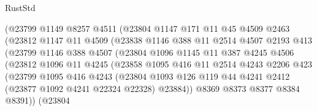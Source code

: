\begin{lexlean}{RustStd}
\begin{coremodule}
                      (@23799
                        @1149
                        @8257
                        @4511
                        (@23804
                          @1147
                          @171
                          @11
                          @45
                          @4509
                          @2463
                          (@23812
                            @1147
                            @11
                            @4509
                            (@23838
                              @1146
                              @388
                              @11
                              @2514
                              @4507
                              @2193
                              @413
                              (@23799
                                @1146
                                @388
                                @4507
                                (@23804
                                  @1096
                                  @1145
                                  @11
                                  @387
                                  @4245
                                  @4506
                                  (@23812
                                    @1096
                                    @11
                                    @4245
                                    (@23858
                                      @1095
                                      @416
                                      @11
                                      @2514
                                      @4243
                                      @2206
                                      @423
                                      (@23799
                                        @1095
                                        @416
                                        @4243
                                        (@23804
                                          @1093
                                          @126
                                          @119
                                          @44
                                          @4241
                                          @2412
                                          (@23877 @1092 @4241 @22324 @22328)
                                          @23884))
                                      @8369
                                      @8373
                                      @8377
                                      @8384
                                      @8391))
                                  (@23804

\end{coremodule}
\end{lexlean}

